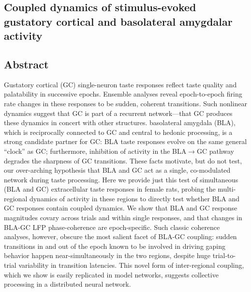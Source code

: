 \begin{refsection}

\chapter[Cortico-Amygdalar Dynamics in Taste Processing]{Coupled dynamics of stimulus-evoked gustatory cortical and basolateral amygdalar activity}

\section{Abstract}
Gustatory cortical (GC) single-neuron taste responses reflect taste quality and palatability in successive epochs. Ensemble analyses reveal epoch-to-epoch firing rate changes in these responses to be sudden, coherent transitions. Such nonlinear dynamics suggest that GC is part of a recurrent network—that GC produces these dynamics in concert with other structures. basolateral amygdala (BLA), which is reciprocally connected to GC and central to hedonic processing, is a strong candidate partner for GC: BLA taste responses evolve on the same general “clock” as GC; furthermore, inhibition of activity in the BLA$\rightarrow$GC pathway degrades the sharpness of GC transitions. These facts motivate, but do not test, our over-arching hypothesis that BLA and GC act as a single, co-modulated network during taste processing. Here we provide just this test of simultaneous (BLA and GC) extracellular taste responses in female rats, probing the multi-regional dynamics of activity in these regions to directly test whether BLA and GC responses contain coupled dynamics. We show that BLA and GC response magnitudes covary across trials and within single responses, and that changes in BLA-GC LFP phase-coherence are epoch-specific. Such classic coherence analyses, however, obscure the most salient facet of BLA-GC coupling: sudden transitions in and out of the epoch known to be involved in driving gaping behavior happen near-simultaneously in the two regions, despite huge trial-to-trial variability in transition latencies. This novel form of inter-regional coupling, which we show is easily replicated in model networks, suggests collective processing in a distributed neural network.


\end{refsection}
